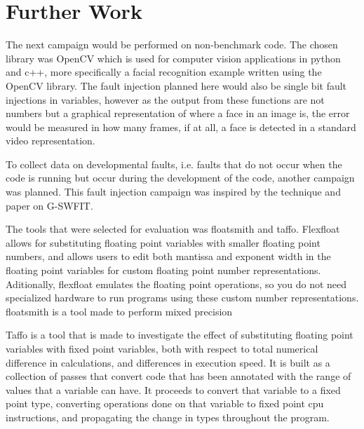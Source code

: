 \section{Further Work}

The next campaign would be performed on non-benchmark code. The chosen library was OpenCV which is used for computer vision applications in python and c++, more specifically a facial recognition example written using the OpenCV library. The fault injection planned here would also be single bit fault injections in variables, however as the output from these functions are not numbers but a graphical representation of where a face in an image is, the error would be measured in how many frames, if at all, a face is detected in a standard video representation.

To collect data on developmental faults, i.e. faults that do not occur when the code is running but occur during the development of the code, another campaign was planned. This fault injection campaign was inspired by the technique and paper on G-SWFIT.

The tools that were selected for evaluation was floatsmith and taffo. Flexfloat allows for substituting floating point variables with smaller floating point numbers, and allows users to edit both mantissa and exponent width in the floating point variables for custom floating point number representations. Aditionally, flexfloat emulates the floating point operations, so you do not need specialized hardware to run programs using these custom number representations.
floatsmith is a tool made to perform mixed precision

Taffo is a tool that is made to investigate the effect of substituting floating point variables with fixed point variables, both with respect to total numerical difference in calculations, and differences in execution speed. It is built as a collection of passes that convert code that has been annotated with the range of values that a variable can have. It proceeds to convert that variable to a fixed point type, converting operations done on that variable to fixed point cpu instructions, and propagating the change in types throughout the program.

